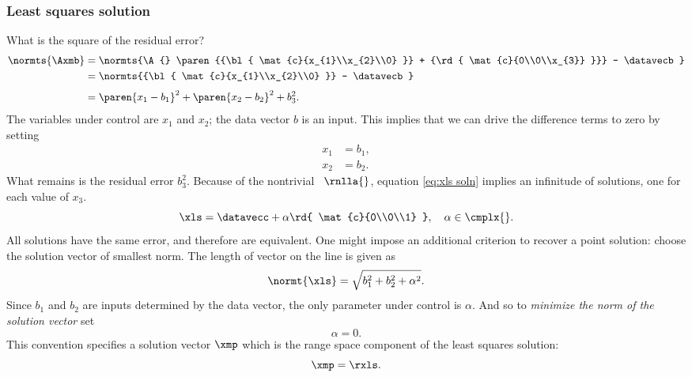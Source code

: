 \subsubsection{Least squares solution}
What is the square of the residual error?
%
\begin{equation}
  \begin{split}
    \normts{\Axmb} 
      &= \normts{\A{} \paren{{\bl{ \mat{c}{x_{1}\\x_{2}\\0} }} + {\rd{ \mat{c}{0\\0\\x_{3}} }}}  - \datavecb} \\
      &= \normts{{\bl{ \mat{c}{x_{1}\\x_{2}\\0} }} - \datavecb} \\[3pt]
      &= \paren{x_{1} - b_{1}}^{2} + \paren{x_{2} - b_{2}}^{2} + b_{3}^{2}.
  \end{split}
\end{equation}
%
The variables under control are $x_{1}$ and $x_{2}$; the data vector $b$ is an input. This implies that we can drive the difference terms to zero by setting
%
\begin{equation}
  \begin{split}
    x_{1} &= b_{1}, \\
    x_{2} &= b_{2}.
  \end{split}
  \label{eq:xls soln}
\end{equation}
%
What remains is the residual error $b_{3}^{2}$. Because of the nontrivial \ns \ $\rnlla{}$, equation \eqref{eq:xls soln} implies an infinitude of solutions, one for each value of $x_{3}$. 
%
\begin{equation}
  \xls = \datavecc + \alpha {\rd{ \mat{c}{0\\0\\1} }}, \quad \alpha \in \cmplx{}.
\end{equation}
%
All solutions have the same error, and therefore are equivalent. One might impose an additional criterion to recover a point solution: choose the solution vector of smallest norm. The length of vector on the line is given as
%
\begin{equation}
  \normt{\xls} = \sqrt{ b_{1}^{2} + b_{2}^{2} + \alpha^{2} }.
\end{equation}
%
Since $b_{1}$ and $b_{2}$ are inputs determined by the data vector, the only parameter under control is $\alpha$. And so to \emph{minimize the norm of the solution vector} set
\begin{equation*}
  \alpha = 0.
\end{equation*}
%
This convention specifies a solution vector $\xmp$ which is the range space component of the least squares solution:
%
\begin{equation}
  \xmp = \rxls.
\end{equation}
%

